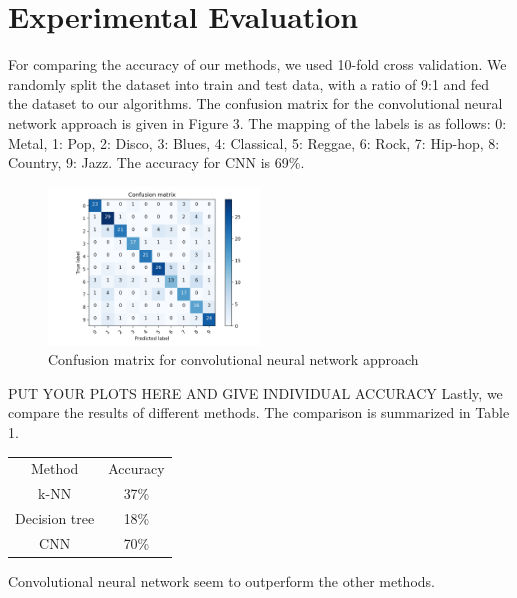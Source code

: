\documentclass[acmtog, authorversion]{acmart}
\begin{document}
\section{Experimental Evaluation}
For comparing the accuracy of our methods, we used 10-fold cross validation. We randomly split the dataset into train and test data, with a ratio of 9:1
and fed the dataset to our algorithms. The confusion matrix for the convolutional neural network approach is given in Figure 3. The mapping of the labels is as follows:
 0: Metal, 1: Pop, 2: Disco, 3: Blues, 4: Classical, 5: Reggae, 6: Rock, 7: Hip-hop, 8: Country, 9: Jazz. The accuracy for CNN is 69\%. \\
\begin{figure}[h!]
  \centering
  \includegraphics[width=0.5\textwidth]{conf_matrix}
  \caption{Confusion matrix for convolutional neural network approach}
  \end{figure}

  PUT YOUR PLOTS HERE AND GIVE INDIVIDUAL ACCURACY
Lastly, we compare the results of different methods. The comparison is summarized in Table 1.
\begin{center}
   \label{tab:title} 
  \begin{tabular}{ |c|c| } 
   \hline
   Method & Accuracy  \\ 
   k-NN & 37\% \\ 
   Decision tree & 18\%  \\ 
   CNN & 70\% \\
   \hline
  \end{tabular}
  \end{center}
Convolutional neural network seem to outperform the other methods.
\end{document}

